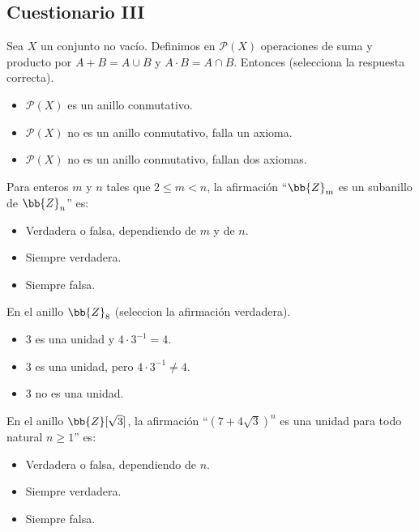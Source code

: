 \subsection{Cuestionario III}
\begin{ejercicio}
    Sea $X$ un conjunto no vacío. Definimos en $\mathcal{P}(X)$ operaciones de suma y producto por $A+B = A \cup B$ y $A \cdot B = A \cap B$. Entonces (selecciona la respuesta correcta).
    \begin{itemize}
        \item $\mathcal{P}(X)$ es un anillo conmutativo.
        \item $\mathcal{P}(X)$ no es un anillo conmutativo, falla un axioma.
        \item $\mathcal{P}(X)$ no es un anillo conmutativo, fallan dos axiomas.
    \end{itemize}
\end{ejercicio}

\begin{ejercicio}
    Para enteros $m$ y $n$ tales que $2 \leq m < n$, la afirmación ``$\bb{Z}_m$ es un subanillo de $\bb{Z}_n$'' es:
    \begin{itemize}
        \item Verdadera o falsa, dependiendo de $m$ y de $n$.
        \item Siempre verdadera.
        \item Siempre falsa.
    \end{itemize}
\end{ejercicio}

\begin{ejercicio}
    En el anillo $\bb{Z}_8$ (seleccion la afirmación verdadera).
    \begin{itemize}
        \item $3$ es una unidad y $4 \cdot 3^{-1} = 4$.
        \item $3$ es una unidad, pero $4 \cdot 3^{-1} \neq 4$.
        \item $3$ no es una unidad.
    \end{itemize}
\end{ejercicio}

\begin{ejercicio}
    En el anillo $\bb{Z}[\sqrt{3}]$, la afirmación ``${(7+4\sqrt{3})}^n$ es una unidad para todo natural $n \geq 1$'' es:
    \begin{itemize}
        \item Verdadera o falsa, dependiendo de $n$.
        \item Siempre verdadera.
        \item Siempre falsa.
    \end{itemize}
\end{ejercicio}

